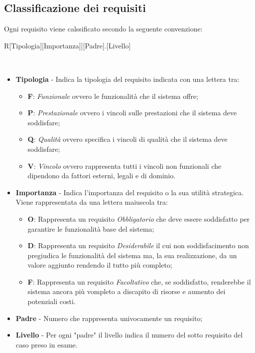\subsection{Classificazione dei requisiti}
Ogni requisito viene calssificato secondo la seguente convenzione:\\
\centerline{R[Tipologia][Importanza]][Padre].[Livello]}\\
\begin{itemize}
	\item \textbf{Tipologia} - Indica la tipologia del requisito indicata con una lettera tra:
	\begin{itemize}
		\item \textbf{F}: \textit{Funzionale} ovvero le funzionalità che il sistema offre;
		\item \textbf{P}: \textit{Prestazionale} ovvero i vincoli sulle prestazioni che il sistema deve soddisfare;
		\item \textbf{Q}: \textit{Qualità} ovvero specifica i vincoli di qualità che il sistema deve soddisfare;
		\item \textbf{V}: \textit{Vincolo} ovvero rappresenta tutti i vincoli non funzionali che dipendono da fattori esterni, legali e di dominio.
	\end{itemize}
	\item \textbf{Importanza} - Indica l'importanza del requisito o la sua utilità strategica. Viene rappresentata da una lettera maiuscola tra:
	\begin{itemize}
		\item \textbf{O}: Rappresenta un requisito \textit{Obbligatorio} che deve essere soddisfatto per garantire le funzionalità base del sistema;
		\item \textbf{D}: Rappresenta un requisito \textit{Desiderabile} il cui non soddisfacimento non pregiudica le funzionalità del sistema ma, la sua realizzazione, da un valore aggiunto rendendo il tutto più completo;
		\item \textbf{F}: Rappresenta un requisito \textit{Facoltativo} che, se soddisfatto, renderebbe il sistema ancora più vompleto a discapito di risorse e aumento dei potenziali costi.
	\end{itemize}
	\item \textbf{Padre} - Numero che rappresenta univocamente un requisito;
	\item \textbf{Livello} - Per ogni "padre" il livello indica il numero del sotto requisito del caso preso in esame.
\end{itemize}
